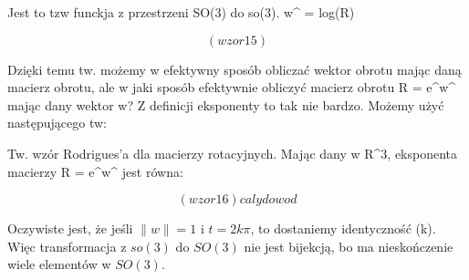 \documentclass[a4paper,12pt]{article}
\begin{document}
Jest to tzw funckja z przestrzeni SO(3) do so(3). w^ = log(R)

\begin{equation}
(wzor 15)
\end{equation}

Dzięki temu tw. możemy w efektywny sposób obliczać wektor obrotu mając daną macierz obrotu, ale w jaki sposób efektywnie obliczyć macierz obrotu R = e^w^ mając dany wektor w? Z definicji eksponenty to tak nie bardzo. Możemy użyć następującego tw:

Tw. wzór Rodrigues'a dla macierzy rotacyjnych. Mając dany w \in R^3, eksponenta macierzy R = e^w^ jest równa:

\begin{equation}
(wzor 16) caly dowod
\end{equation}

Oczywiste jest, że jeśli $\| w \|=1$ i $t=2k\pi$, to dostaniemy identyczność (\forall k). Więc transformacja z $so(3)$ do $SO(3)$ nie jest bijekcją, bo ma nieskończenie wiele elementów w $SO(3)$.
\end{document}
